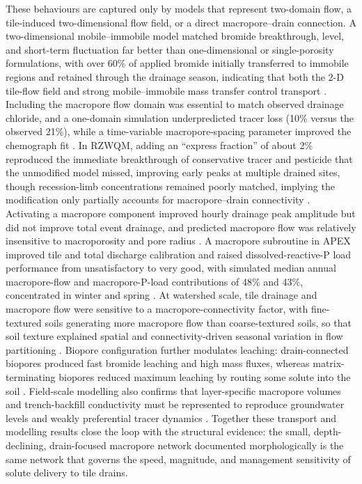These behaviours are captured only by models that represent two-domain flow, a
tile-induced two-dimensional flow field, or a direct macropore--drain connection. A
two-dimensional mobile--immobile model matched bromide breakthrough, level, and
short-term fluctuation far better than one-dimensional or single-porosity
formulations, with over 60\% of applied bromide initially transferred to immobile
regions and retained through the drainage season, indicating that both the 2-D
tile-flow field and strong mobile--immobile mass transfer control transport
\parencite{Köhne2006}. Including the macropore flow domain was essential to match
observed drainage chloride, and a one-domain simulation underpredicted tracer loss
(10\% versus the observed 21\%), while a time-variable macropore-spacing parameter
improved the chemograph fit \parencite{Villholth1998b}. In RZWQM, adding an
``express fraction'' of about 2\% reproduced the immediate breakthrough of conservative
tracer and pesticide that the unmodified model missed, improving early peaks at
multiple drained sites, though recession-limb concentrations remained poorly matched,
implying the modification only partially accounts for macropore--drain connectivity
\parencite{Fox2004,Fox2007b}. Activating a macropore component improved hourly drainage
peak amplitude but did not improve total event drainage, and predicted macropore flow
was relatively insensitive to macroporosity and pore radius \parencite{Li2023d}. A
macropore subroutine in APEX improved tile and total discharge calibration and raised
dissolved-reactive-P load performance from unsatisfactory to very good, with simulated
median annual macropore-flow and macropore-P-load contributions of 48\% and 43\%,
concentrated in winter and spring \parencite{Ford2017}. At watershed scale, tile
drainage and macropore flow were sensitive to a macropore-connectivity factor, with
fine-textured soils generating more macropore flow than coarse-textured soils, so that
soil texture explained spatial and connectivity-driven seasonal variation in flow
partitioning \parencite{Poon2021}. Biopore configuration further modulates leaching:
drain-connected biopores produced fast bromide leaching and high mass fluxes, whereas
matrix-terminating biopores reduced maximum leaching by routing some solute into the
soil \parencite{Holbak2021}. Field-scale modelling also confirms that layer-specific
macropore volumes and trench-backfill conductivity must be represented to reproduce
groundwater levels and weakly preferential tracer dynamics
\parencite{AURA1995,Bechtold2007}. Together these transport and modelling results
close the loop with the structural evidence: the small, depth-declining, drain-focused
macropore network documented morphologically is the same network that governs the
speed, magnitude, and management sensitivity of solute delivery to tile drains.